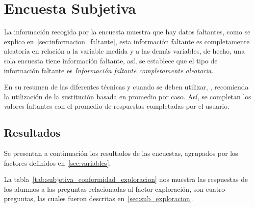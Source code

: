 \section{Encuesta Subjetiva}



La información recogida por la encuesta muestra que hay datos faltantes, como se
explico en~\ref{sec:informacion_faltante}, esta información faltante es
completamente aleatoria en relación a la variable medida y a las demás
variables, de hecho, una sola encuesta tiene información faltante, así, se
establece que el tipo de información faltante es \emph{Información faltante
    completamente aleatoria}.

En su resumen de las diferentes técnicas y cuando se deben utilizar,
\cite{tsikriktsis2005review}, recomienda la utilización de la sustitución basada
en promedio por caso. Así, se completan los valores faltantes con el promedio de
respuestas completadas por el usuario.

\subsection{Resultados}

Se presentan a continuación los resultados de las encuestas, agrupados por los
factores definidos en~\ref{sec:variables}.

La tabla~\ref{tab:subjetiva_conformidad_exploracion} nos muestra las respuestas
de los alumnos a las preguntas relacionadas al factor exploración, son cuatro
preguntas, las cuales fueron descritas en~\ref{sec:sub_exploracion}. 


